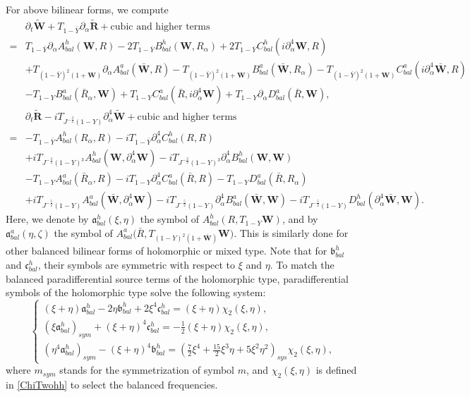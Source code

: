 \documentclass[10pt]{amsart}
\theoremstyle{remark}
\theoremstyle{definition}
\numberwithin{equation}{section}
\newcommand{\p}{\partial}
\newcommand{\al}{\alpha}
\newcommand{\f}{\frac}
\newcommand{\bw}{\mathbf{W}}
\begin{document}
For above bilinear forms, we compute
\begin{align*}
&\partial_t \tilde{\mathbf{W}}+T_{1-\bar{Y}} \partial_\alpha \tilde{\mathbf{R}} + \text{cubic and higher terms} \\
=& T_{1-\bar{Y}}\partial_\alpha A^{h}_{bal}(\bw, R) -2T_{1-\bar{Y}}B^{h}_{bal}(\bw,R_{\al}) + 2 T_{1-\bar{Y}}C^{h}_{bal}(i\p^4_{\al}\bw,R) \\
&+T_{(1-\bar{Y})^2(1+\bw)}\p_{\al}A^{a}_{bal}(\bar{\bw},R)-T_{(1-\bar{Y})^2(1+\bw)}B^{a}_{bal}(\bar{\bw},R_{\al})-T_{(1-\bar{Y})^2(1+\bw)}C^{a}_{bal}(i\p^4_{\al}\bar{\bw},R)\\
 &-T_{1-Y}B^{a}_{bal}(\bar{R}_\alpha,\bw)+T_{1-Y}C^{a}_{bal}(\bar{R},i\p_\al^4\bw) + T_{1-Y}\partial_\alpha D^{a}_{bal}(\bar{R}, \bw),\\
&\partial_t \tilde{\mathbf{R}}  -iT_{J^{-\frac{3}{2}}(1-Y)}\p_\al^4 \tilde{\mathbf{W}}+ \text{cubic and higher  terms} \\
=& -T_{1-\bar{Y}}A^{h}_{bal}(R_\alpha ,R) - iT_{1-\bar{Y}}\partial_\alpha^4 C^{h}_{bal}(R,R)\\
&+iT_{J^{-\frac{3}{2}}(1-Y)^3}A^{h}_{bal}(\bw, \p_\al^4\bw) -iT_{J^{-\frac{3}{2}}(1-Y)^3}\partial_\alpha^4 B^{h}_{bal}(\bw,\bw) \\
 &-T_{1-Y}A^{a}_{bal}(\bar{R}_\alpha,R) - iT_{1-Y}\partial_\alpha^4 C^{a}_{bal}( \bar{R},R) - T_{1-Y}D^{a}_{bal}(\bar{R},R_\alpha)\\
&+ iT_{J^{-\f52}(1-Y)}A^{a}_{bal}(\bar{\bw},\p_\al^4 \bw) -iT_{J^{-\f52}(1-Y)}\partial_\alpha^4 B^{a}_{bal}(\bar{\bw}, \bw) -iT_{J^{-\f52}(1-Y)}D^{h}_{bal}(\p_\al^4\bar{\bw},\bw).
\end{align*}
Here, we denote by $\mathfrak{a}^{h}_{bal}(\xi, \eta)$  the symbol of $A^{h}_{bal}(R,T_{1-Y}\bw)$, and by
$\mathfrak{a}^{a}_{bal}(\eta, \zeta)$  the symbol of $A^{a}_{bal}\Big(\bar{R}, T_{(1-Y)^2(1+\bar{\bw})}\bw\Big)$. 
This is similarly done for other balanced bilinear forms of holomorphic or mixed type.
Note that for $\mathfrak{b}^{h}_{bal}$ and  $\mathfrak{c}^{h}_{bal}$, their symbols are symmetric with respect to $\xi$ and $\eta$.
To match the balanced paradifferential source terms of the holomorphic type, paradifferential symbols of the holomorphic type solve the following system:
\begin{equation} \label{SymmetrizedSys}
\begin{cases}
(\xi + \eta)\mathfrak{a}^{h}_{bal}-2\eta\mathfrak{b}^{h}_{bal}+2\xi^4\mathfrak{c}^{h}_{bal}= (\xi+\eta)\chi_2(\xi,\eta),\\
(\xi\mathfrak{a}^{h}_{bal})_{sym}+(\xi+\eta)^4\mathfrak{c}^{h}_{bal}= -\f12(\xi+\eta)\chi_{2}(\xi,\eta),\\
(\eta^4 \mathfrak{a}^{h}_{bal})_{sym}-(\xi+\eta)^4\mathfrak{b}^{h}_{bal}=\left(\f72\xi^4+\f{15}{2}\xi^3\eta+5\xi^2\eta^2\right)_{sys}\chi_{2}(\xi,\eta),
\end{cases}
\end{equation}
where $m_{sym}$ stands for the symmetrization of symbol $m$, and $\chi_{2}(\xi, \eta)$ is defined in \eqref{ChiTwohh} to select the balanced frequencies.
\end{document}
